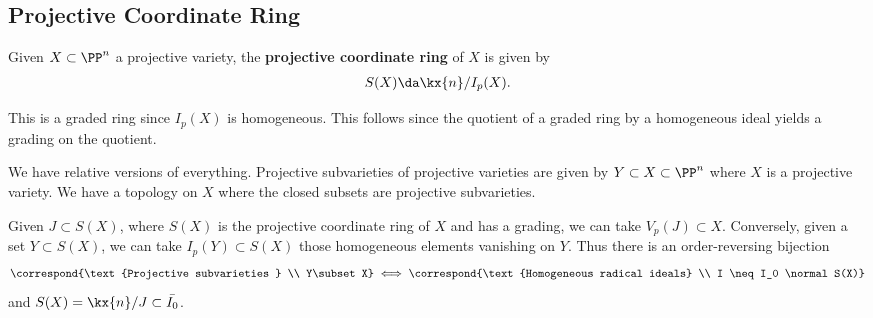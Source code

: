 \hypertarget{projective-coordinate-ring}{%
\subsection{Projective Coordinate
Ring}\label{projective-coordinate-ring}}

\begin{definition}

Given \(X\subset \PP^n\) a projective variety, the \textbf{projective
coordinate ring} of \(X\) is given by
\begin{align*}  
S(X) \da \kx{n} / I_p(X)
.\end{align*}

\end{definition}

\begin{remark}

This is a graded ring since \(I_p(X)\) is homogeneous. This follows
since the quotient of a graded ring by a homogeneous ideal yields a
grading on the quotient.

\end{remark}

\begin{remark}

We have relative versions of everything. Projective subvarieties of
projective varieties are given by \(Y\subset X\subset \PP^n\) where
\(X\) is a projective variety. We have a topology on \(X\) where the
closed subsets are projective subvarieties.

\end{remark}

\begin{remark}

Given \(J\subset S(X)\), where \(S(X)\) is the projective coordinate
ring of \(X\) and has a grading, we can take \(V_p(J) \subset X\).
Conversely, given a set \(Y\subset S(X)\), we can take
\(I_p(Y) \subset S(X)\) those homogeneous elements vanishing on \(Y\).
Thus there is an order-reversing bijection
\begin{align*}  
\correspond{\text{Projective subvarieties } \\ Y\subset X}
\iff
\correspond{\text{Homogeneous radical ideals} \\ I \neq I_0 \normal S(X)}
\end{align*} and \(S(X) = \kx{n}/J \subset \bar{I_0}\).

\end{remark}

